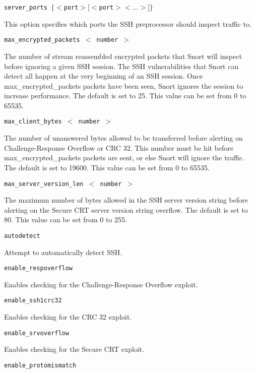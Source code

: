 \documentclass[english]{report}
\newcounter{slistnum}
\newenvironment{slist}
{ \begin{list}{ {\bf \arabic{slistnum}.} }{\usecounter{slistnum} } }
{ \end{list} }
\begin{document}
\begin{slist}

\item \texttt{server\_ports $\{ <$port$> [<$port$> <...>] \}$}

This option specifies which ports the SSH preprocessor should inspect traffic
to.

\item \texttt{max\_encrypted\_packets $<$ number $>$}

The number of stream reassembled encrypted packets that Snort will inspect before ignoring a given
SSH session. The SSH vulnerabilities that Snort can detect all happen at the
very beginning of an SSH session. Once max\_encrypted\_packets packets have been
seen, Snort ignores the session to increase performance. The default is set to 25.
This value can be set from 0 to 65535.

\item \texttt{max\_client\_bytes $<$ number $>$}

The number of unanswered bytes allowed to be transferred before alerting on
Challenge-Response Overflow or CRC 32. This number must be hit before
max\_encrypted\_packets packets are sent, or else Snort will ignore the traffic.
The default is set to 19600. This value can be set from 0 to 65535.

\item \texttt{max\_server\_version\_len $<$ number $>$}

The maximum number of bytes allowed in the SSH server version string before
alerting on the Secure CRT server version string overflow. The default is set to
80. This value can be set from 0 to 255.

\item \texttt{autodetect}

Attempt to automatically detect SSH.

\item \texttt{enable\_respoverflow}

Enables checking for the Challenge-Response Overflow exploit.

\item \texttt{enable\_ssh1crc32}

Enables checking for the CRC 32 exploit.

\item \texttt{enable\_srvoverflow}

Enables checking for the Secure CRT exploit.

\item \texttt{enable\_protomismatch}


\end{slist}
\end{document}
